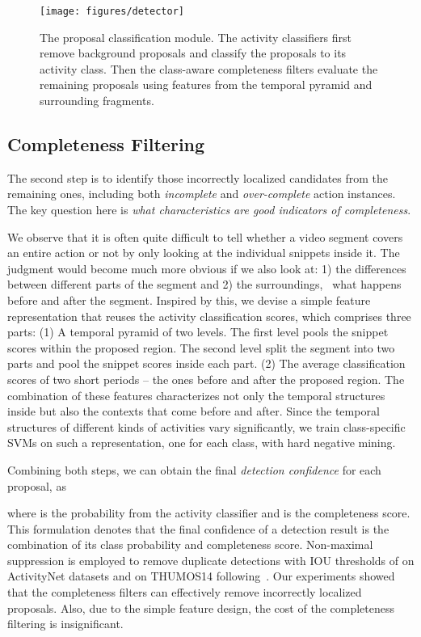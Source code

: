 \documentclass[10pt,twocolumn,letterpaper]{article}
\begin{document}
\begin{figure}
\centering
\texttt{[image: figures/detector]}
\caption{The proposal classification module. The activity classifiers first remove background proposals and classify the proposals to its activity class.
	Then the class-aware completeness filters evaluate the remaining proposals using features from the temporal pyramid and surrounding fragments.}
\label{fig:detector}
\end{figure}


\subsection{Completeness Filtering}
\label{sec:detector/loc}

The second step is to identify those incorrectly localized candidates from the remaining ones,
including both \emph{incomplete} and \emph{over-complete} action instances. 
The key question here is {\em what characteristics are good indicators of completeness}.

We observe that it is often quite difficult to tell whether a video segment covers an entire action or not
by only looking at the individual snippets inside it. 
The judgment would become much more obvious if we also look at: 1) the differences between different parts of the segment and 2) the surroundings, \eg~what happens
before and after the segment.
Inspired by this, we devise a simple feature representation that reuses the activity classification scores, 
which comprises three parts:
(1) A temporal pyramid of two levels. The first level pools the snippet scores within the proposed region. The second level split the segment into two parts and pool the snippet scores inside each part.
(2) The average classification scores of two short periods -- the ones before and after the proposed region.
The combination of these features characterizes not only the temporal structures inside but also 
the contexts that come before and after. 
Since the temporal structures of different kinds of activities vary significantly,
we train class-specific SVMs on such a representation, one for each class, with hard negative mining. 


Combining both steps, we can obtain the final \emph{detection confidence} for each proposal, as 

where  is the probability from the activity classifier and  is the completeness score.
This formulation denotes that the final confidence of a detection result is the combination of its class probability and completeness score.
Non-maximal suppression is employed to remove duplicate detections with IOU thresholds of  on ActivityNet datasets and  on THUMOS14 following~\cite{Shou2016SCNN}.
Our experiments showed that the completeness filters can effectively remove 
incorrectly localized proposals.
Also, due to the simple feature design, the cost of the completeness filtering is insignificant.
\end{document}
